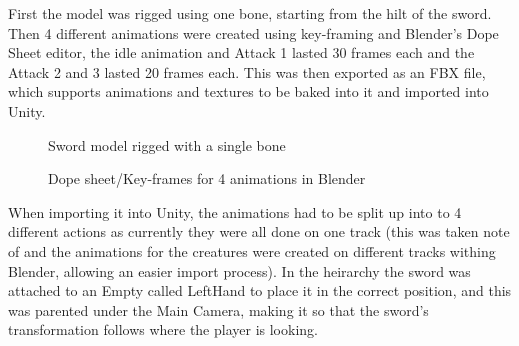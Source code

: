 \documentclass[11pt]{report}
\begin{document}
First the model was rigged using one bone, starting from the hilt of the sword. Then 4 different animations were created using key-framing and Blender's Dope Sheet editor, the idle animation and Attack 1 lasted 30 frames each and the Attack 2 and 3 lasted 20 frames each. This was then exported as an FBX file, which supports animations and textures to be baked into it and imported into Unity.
\begin{figure}[H]
    \begin{minipage}{.2\textwidth}
        \centering
        \caption{Sword model rigged with a single bone}
    \end{minipage}
    \begin{minipage}{.8\textwidth}
        \centering
        \caption{Dope sheet/Key-frames for 4 animations in Blender}
    \end{minipage}
\end{figure}

When importing it into Unity, the animations had to be split up into to 4 different actions as currently they were all done on one track (this was taken note of and the animations for the creatures were created on different tracks withing Blender, allowing an easier import process). In the heirarchy the sword was attached to an Empty called LeftHand to place it in the correct position, and this was parented under the Main Camera, making it so that the sword's transformation follows where the player is looking.
\end{document}

